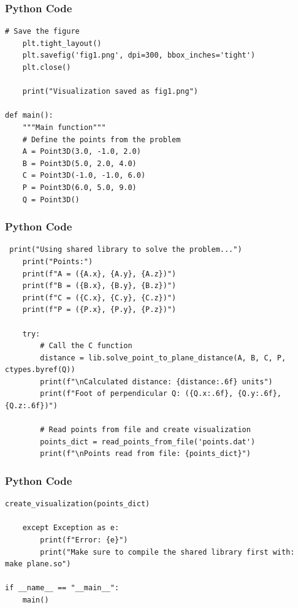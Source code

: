 \documentclass{beamer}
\begin{document}
\begin{frame}[fragile]
    \frametitle{Python Code}
    \begin{lstlisting}
# Save the figure
    plt.tight_layout()
    plt.savefig('fig1.png', dpi=300, bbox_inches='tight')
    plt.close()

    print("Visualization saved as fig1.png")

def main():
    """Main function"""
    # Define the points from the problem
    A = Point3D(3.0, -1.0, 2.0)
    B = Point3D(5.0, 2.0, 4.0)
    C = Point3D(-1.0, -1.0, 6.0)
    P = Point3D(6.0, 5.0, 9.0)
    Q = Point3D()
    \end{lstlisting}
\end{frame}

\begin{frame}[fragile]
    \frametitle{Python Code}
    \begin{lstlisting}
 print("Using shared library to solve the problem...")
    print("Points:")
    print(f"A = ({A.x}, {A.y}, {A.z})")
    print(f"B = ({B.x}, {B.y}, {B.z})")
    print(f"C = ({C.x}, {C.y}, {C.z})")
    print(f"P = ({P.x}, {P.y}, {P.z})")

    try:
        # Call the C function
        distance = lib.solve_point_to_plane_distance(A, B, C, P, ctypes.byref(Q))
        print(f"\nCalculated distance: {distance:.6f} units")
        print(f"Foot of perpendicular Q: ({Q.x:.6f}, {Q.y:.6f}, {Q.z:.6f})")

        # Read points from file and create visualization
        points_dict = read_points_from_file('points.dat')
        print(f"\nPoints read from file: {points_dict}")
    \end{lstlisting}
\end{frame}

\begin{frame}[fragile]
    \frametitle{Python Code}
    \begin{lstlisting}
create_visualization(points_dict)

    except Exception as e:
        print(f"Error: {e}")
        print("Make sure to compile the shared library first with: make plane.so")

if __name__ == "__main__":
    main()
    \end{lstlisting}
\end{frame}
\end{document}
